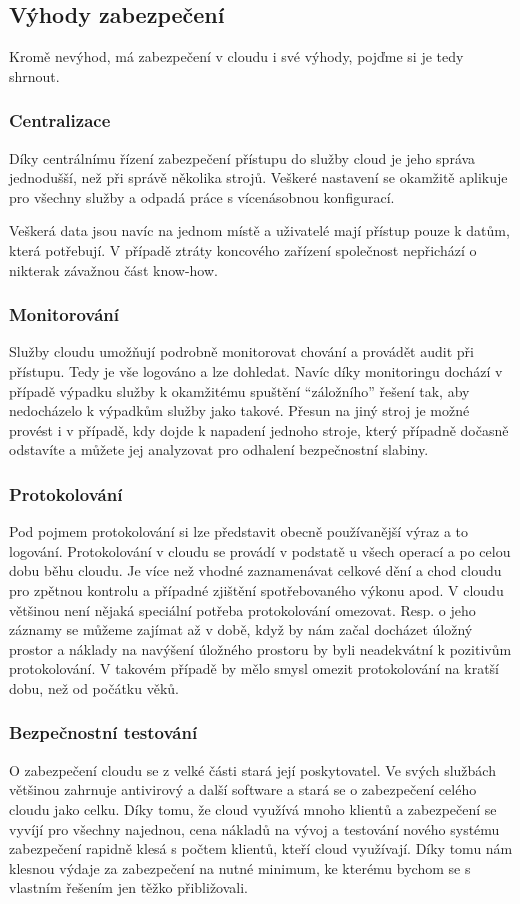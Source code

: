 \subsection{Výhody zabezpečení}
Kromě nevýhod, má zabezpečení v cloudu i své výhody, pojďme si je tedy shrnout.

\subsubsection{Centralizace}
Díky centrálnímu řízení zabezpečení přístupu do služby cloud je jeho správa jednodušší, než při správě několika strojů. Veškeré nastavení se okamžitě aplikuje pro všechny služby a odpadá práce s vícenásobnou konfigurací.

Veškerá data jsou navíc na jednom místě a uživatelé mají přístup pouze k datům, která potřebují. V případě ztráty koncového zařízení společnost nepřichází o nikterak závažnou část know-how.

\subsubsection{Monitorování}
Služby cloudu umožňují podrobně monitorovat chování a provádět audit při přístupu. Tedy je vše logováno a lze dohledat. Navíc díky monitoringu dochází v případě výpadku služby k okamžitému spuštění "`záložního"' řešení tak, aby nedocházelo k výpadkům služby jako takové. Přesun na jiný stroj je možné provést i v případě, kdy dojde k napadení jednoho stroje, který případně dočasně odstavíte a můžete jej analyzovat pro odhalení bezpečnostní slabiny.

\subsubsection{Protokolování}
Pod pojmem protokolování si lze představit obecně používanější výraz a to logování. Protokolování v cloudu se provádí v podstatě u všech operací a po celou dobu běhu cloudu. Je více než vhodné zaznamenávat celkové dění a chod cloudu pro zpětnou kontrolu a případné zjištění spotřebovaného výkonu apod. V cloudu většinou není nějaká speciální potřeba protokolování omezovat. Resp. o jeho záznamy se můžeme zajímat až v době, když by nám začal docházet úložný prostor a náklady na navýšení úložného prostoru by byli neadekvátní k pozitivům protokolování. V takovém případě by mělo smysl omezit protokolování na kratší dobu, než od počátku věků.

\subsubsection{Bezpečnostní testování}
O zabezpečení cloudu se z velké části stará její poskytovatel. Ve svých službách většinou zahrnuje antivirový a další software a stará se o zabezpečení celého cloudu jako celku. Díky tomu, že cloud využívá mnoho klientů a zabezpečení se vyvíjí pro všechny najednou, cena nákladů na vývoj a testování nového systému zabezpečení rapidně klesá s počtem klientů, kteří cloud využívají. Díky tomu nám klesnou výdaje za zabezpečení na nutné minimum, ke kterému bychom se s vlastním řešením jen těžko přibližovali.

